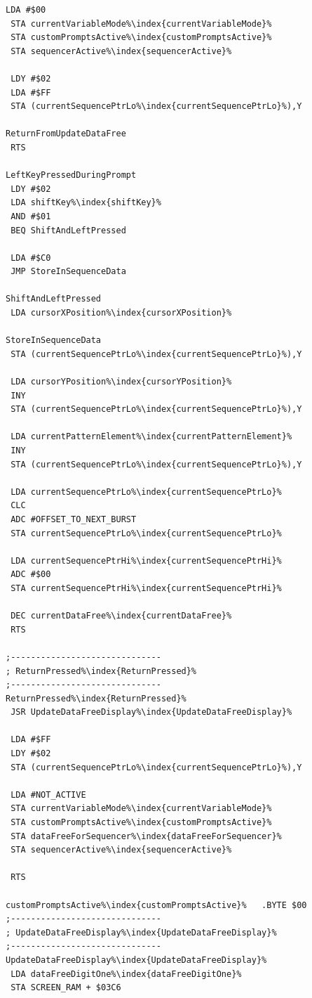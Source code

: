 \begin{minipage}[b]{0.33\linewidth}
\begin{lrbox}{\mybox}%
\begin{lstlisting}[basicstyle=\ttfamily\tiny,escapechar=\%]
 LDA #$00
 STA currentVariableMode%\index{currentVariableMode}%
 STA customPromptsActive%\index{customPromptsActive}%
 STA sequencerActive%\index{sequencerActive}%

 LDY #$02
 LDA #$FF
 STA (currentSequencePtrLo%\index{currentSequencePtrLo}%),Y

ReturnFromUpdateDataFree
 RTS

LeftKeyPressedDuringPrompt
 LDY #$02
 LDA shiftKey%\index{shiftKey}%
 AND #$01
 BEQ ShiftAndLeftPressed

 LDA #$C0
 JMP StoreInSequenceData

ShiftAndLeftPressed
 LDA cursorXPosition%\index{cursorXPosition}%

StoreInSequenceData
 STA (currentSequencePtrLo%\index{currentSequencePtrLo}%),Y

 LDA cursorYPosition%\index{cursorYPosition}%
 INY
 STA (currentSequencePtrLo%\index{currentSequencePtrLo}%),Y

 LDA currentPatternElement%\index{currentPatternElement}%
 INY
 STA (currentSequencePtrLo%\index{currentSequencePtrLo}%),Y

 LDA currentSequencePtrLo%\index{currentSequencePtrLo}%
 CLC
 ADC #OFFSET_TO_NEXT_BURST
 STA currentSequencePtrLo%\index{currentSequencePtrLo}%

 LDA currentSequencePtrHi%\index{currentSequencePtrHi}%
 ADC #$00
 STA currentSequencePtrHi%\index{currentSequencePtrHi}%

 DEC currentDataFree%\index{currentDataFree}%
 RTS

;------------------------------
; ReturnPressed%\index{ReturnPressed}%
;------------------------------
ReturnPressed%\index{ReturnPressed}%
 JSR UpdateDataFreeDisplay%\index{UpdateDataFreeDisplay}%

 LDA #$FF
 LDY #$02
 STA (currentSequencePtrLo%\index{currentSequencePtrLo}%),Y

 LDA #NOT_ACTIVE
 STA currentVariableMode%\index{currentVariableMode}%
 STA customPromptsActive%\index{customPromptsActive}%
 STA dataFreeForSequencer%\index{dataFreeForSequencer}%
 STA sequencerActive%\index{sequencerActive}%

 RTS

customPromptsActive%\index{customPromptsActive}%   .BYTE $00
;------------------------------
; UpdateDataFreeDisplay%\index{UpdateDataFreeDisplay}%
;------------------------------
UpdateDataFreeDisplay%\index{UpdateDataFreeDisplay}%
 LDA dataFreeDigitOne%\index{dataFreeDigitOne}%
 STA SCREEN_RAM + $03C6


\end{lstlisting}
\end{lrbox}
\end{minipage}
